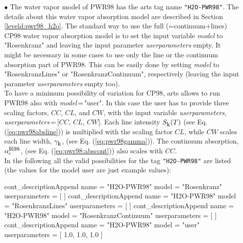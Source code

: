 \begin{itemize}
\item[$\bullet$] The water vapor model of PWR98 \citep{pwr:98}
     has the arts tag name {\tt "H2O-PWR98"}. The details about this water 
     vapor absorption model are described in Section \ref{leveld:pwr98_h2o}. 
     The standard way to use the full (=continuum+lines) CP98 water 
     vapor absorption model is to set the input variable {\it model} 
     to "Rosenkranz" and leaving the input parameter {\it userparameters} empty. 
     It might be necessary in some cases to use only the line or the 
     continuum absorption part of PWR98. This can be easily done 
     by setting {\it model} to "RosenkranzLines" or "RosenkranzContinuum", 
     respectively (leaving the input parameter {\it userparameters} 
     empty too).\\ To have a minimum possibility of variation for CP98, 
     arts allows to run PWR98 also with {\it model}\,=\,"user". 
     In this case the user has to provide three scaling factors,  
     $CC$, $CL$, and $CW$, with the input variable {\it userparameters}, 
     {\it userparameters}\,=\,$[$$CC$, $CL$, $CW$$]$. 
     Each line intensity $S_{\mbox{\rm \small k}}(T)$ (see Eq. (\ref{eq:pwr98absline})) 
     is multiplied with the scaling factor $CL$, while $CW$ scales 
     each line width, $\gamma_{\mbox{\rm \small k}}$, (see Eq. (\ref{eq:pwr98gamma})). 
     The continuum absorption, $\alpha^{\mbox{\rm \small R98}}_{\rm c}$, 
     (see Eq. (\ref{eq:pwr98:abscont})) also scales with $CC$.\\
     In the following all the valid possibilities for the
     tag {\tt "H2O-PWR98"} are listed (the values for the 
     model user are just example values):
\begin{code}
cont_descriptionAppend{
    name           = "H2O-PWR98"
    model          = "Rosenkranz"
    userparameters = [ ]
}
cont_descriptionAppend{
    name           = "H2O-PWR98"
    model          = "RosenkranzLines"
    userparameters = [ ]
}
cont_descriptionAppend{
    name           = "H2O-PWR98"
    model          = "RosenkranzContinuum"
    userparameters = [ ]
}
cont_descriptionAppend{
    name           = "H2O-PWR98"
    model          = "user"
    userparameters = [ 1.0, 1.0, 1.0 ]
}
\end{code}


\end{itemize}
